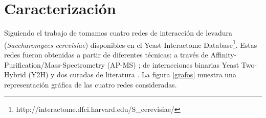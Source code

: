 
\section{Caracterizaci\'on}

Siguiendo el trabajo de \citet{zotenko2008} tomamos cuatro redes de interacci\'on de levadura (\textit{Saccharomyces cerevisiae}) disponibles en el Yeast Interactome Database\footnote{http://interactome.dfci.harvard.edu/S\_cerevisiae/}. Estas redes fueron obtenidas a partir de diferentes t\'ecnicas: a trav\'es de Affinity-Purification/Mass-Spectrometry (AP-MS) \citep{apms_data}; de 
interacciones binarias Yeast Two-Hybrid (Y2H) \citep{y2h_data} y dos curadas de literatura \citep{lit_data}. 
La figura \ref{grafos} muestra una representaci\'on gr\'afica de las cuatro redes consideradas.





